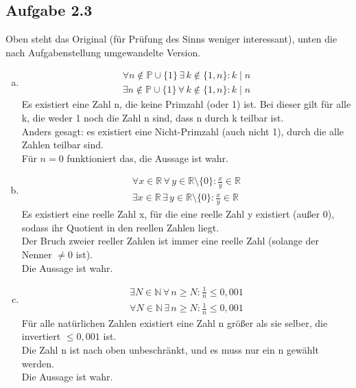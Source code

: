 \documentclass{standalone}
\begin{document}
\subsection{Aufgabe 2.3}
Oben steht das Original (für Prüfung des Sinns weniger interessant), unten die nach Aufgabenstellung umgewandelte Version.
\begin{enumerate}[a)]
    \item \begin{gather}
        \forall n \notin \mathbb{P} \cup \{1\} \, \exists \, k \notin \{1,n\} : k \mid n \\
        \exists n \notin \mathbb{P} \cup \{1\} \, \forall \, k \notin \{1,n\} : k \mid n 
    \end{gather}
    Es existiert eine Zahl n, die keine Primzahl (oder 1) ist. Bei dieser gilt für alle k, die weder 1 noch die Zahl n sind, dass n durch k teilbar ist. \\
    Anders gesagt: es existiert eine Nicht-Primzahl (auch nicht 1), durch die alle Zahlen teilbar sind. \\
    Für $n=0$ funktioniert das, die Aussage ist wahr.

    \item \begin{gather}
        \forall x \in \mathbb{R} \, \forall \, y \in \mathbb{R} \setminus \{0\} : \frac{x}{y} \in \mathbb{R} \\
        \exists x \in \mathbb{R} \, \exists \, y \in \mathbb{R} \setminus \{0\} : \frac{x}{y} \in \mathbb{R}
    \end{gather}
    Es existiert eine reelle Zahl x, für die eine reelle Zahl y existiert (außer 0), sodass ihr Quotient in den reellen Zahlen liegt. \\
    Der Bruch zweier reeller Zahlen ist immer eine reelle Zahl (solange der Nenner $\neq 0$ ist). \\
    Die Aussage ist wahr.
    
    \item \begin{gather}
        \exists N \in \mathbb{N} \, \forall \, n \geq N : \frac{1}{n} \leq 0,001 \\
        \forall N \in \mathbb{N} \, \exists \, n \geq N : \frac{1}{n} \leq 0,001
    \end{gather}
    Für alle natürlichen Zahlen existiert eine Zahl n größer als sie selber, die invertiert $\leq 0,001$ ist. \\
    Die Zahl n ist nach oben unbeschränkt, und es muss nur ein n gewählt werden. \\
    Die Aussage ist wahr.


\end{enumerate}
\end{document}
